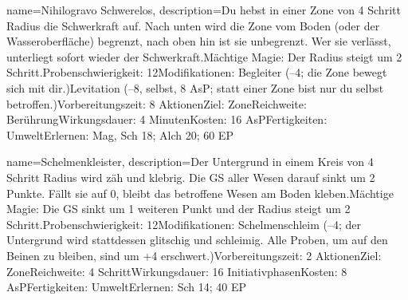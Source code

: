 {
    name={Nihilogravo Schwerelos},
    description={Du hebst in einer Zone von 4 Schritt Radius die Schwerkraft auf. Nach unten wird die Zone vom Boden (oder der Wasseroberfläche) begrenzt, nach oben hin ist sie unbegrenzt. Wer sie verlässt, unterliegt sofort wieder der Schwerkraft.\newline Mächtige Magie: Der Radius steigt um 2 Schritt.\newline Probenschwierigkeit: 12\newline Modifikationen: Begleiter (–4; die Zone bewegt sich mit dir.)\newline Levitation (–8, selbst, 8 AsP; statt einer Zone bist nur du selbst betroffen.)\newline Vorbereitungszeit: 8 Aktionen\newline Ziel: Zone\newline Reichweite: Berührung\newline Wirkungsdauer: 4 Minuten\newline Kosten: 16 AsP\newline Fertigkeiten: Umwelt\newline Erlernen: Mag, Sch 18; Alch 20; 60 EP}
}


{
    name={Schelmenkleister},
    description={Der Untergrund in einem Kreis von 4 Schritt Radius wird zäh und klebrig. Die GS aller Wesen darauf sinkt um 2 Punkte. Fällt sie auf 0, bleibt das betroffene Wesen am Boden kleben.\newline Mächtige Magie: Die GS sinkt um 1 weiteren Punkt und der Radius steigt um 2 Schritt.\newline Probenschwierigkeit: 12\newline Modifikationen: Schelmenschleim (–4; der Untergrund wird stattdessen glitschig und schleimig. Alle Proben, um auf den Beinen zu bleiben, sind um +4 erschwert.)\newline Vorbereitungszeit: 2 Aktionen\newline Ziel: Zone\newline Reichweite: 4 Schritt\newline Wirkungsdauer: 16 Initiativphasen\newline Kosten: 8 AsP\newline Fertigkeiten: Umwelt\newline Erlernen: Sch 14; 40 EP}
}


